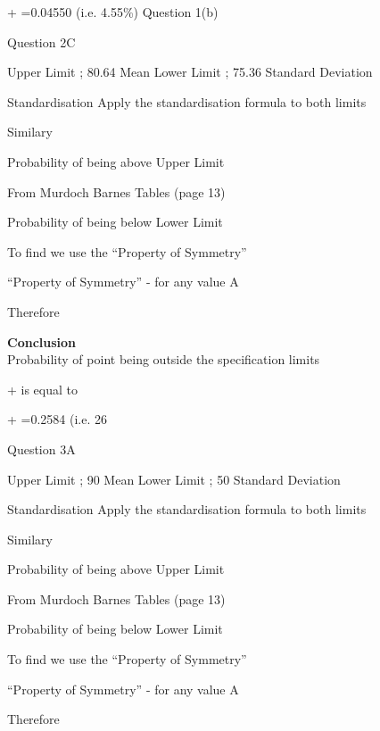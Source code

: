 + =0.04550 	(i.e. 4.55\%) Question 1(b)
















Question 2C

Upper Limit ; 80.64		Mean		 	
Lower Limit ; 75.36		Standard Deviation	 

Standardisation
Apply the standardisation formula	 	to both limits


Similary



Probability of being above Upper Limit

From Murdoch Barnes Tables (page 13)  

Probability of being below Lower Limit


To find   we use the “Property of Symmetry”

“Property of Symmetry” -   for any value A

Therefore 

\noindent \textbf{Conclusion}\\
Probability of point being outside the specification limits 

+ is equal to

+ =0.2584 	(i.e. 26%


\bigskip		










Question 3A

Upper Limit ; 90		Mean		 	
Lower Limit ; 50		Standard Deviation	 

Standardisation
Apply the standardisation formula	 	to both limits


Similary



Probability of being above Upper Limit

From Murdoch Barnes Tables (page 13)  

Probability of being below Lower Limit


To find   we use the “Property of Symmetry”

“Property of Symmetry” -   for any value A

Therefore 


